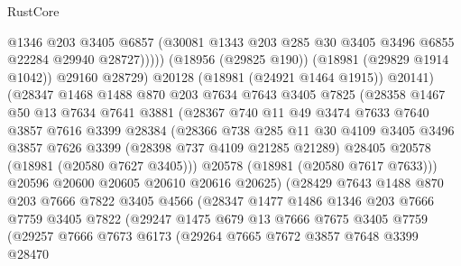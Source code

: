\begin{lexlean}{RustCore}
\begin{coremodule}
                        @1346
                        @203
                        @3405
                        @6857
                        (@30081 @1343 @203 @285 @30 @3405 @3496 @6855 @22284 @29940 @28727)))))
                (@18956 (@29825 @190))
                (@18981 (@29829 @1914 @1042))
                @29160
                @28729)
              @20128
              (@18981 (@24921 @1464 @1915))
              @20141)
            (@28347
              @1468
              @1488
              @870
              @203
              @7634
              @7643
              @3405
              @7825
              (@28358
                @1467
                @50
                @13
                @7634
                @7641
                @3881
                (@28367
                  @740
                  @11
                  @49
                  @3474
                  @7633
                  @7640
                  @3857
                  @7616
                  @3399
                  @28384
                  (@28366
                    @738
                    @285
                    @11
                    @30
                    @4109
                    @3405
                    @3496
                    @3857
                    @7626
                    @3399
                    (@28398 @737 @4109 @21285 @21289)
                    @28405
                    @20578
                    (@18981 (@20580 @7627 @3405)))
                  @20578
                  (@18981 (@20580 @7617 @7633)))
                @20596
                @20600
                @20605
                @20610
                @20616
                @20625)
              (@28429
                @7643
                @1488
                @870
                @203
                @7666
                @7822
                @3405
                @4566
                (@28347
                  @1477
                  @1486
                  @1346
                  @203
                  @7666
                  @7759
                  @3405
                  @7822
                  (@29247
                    @1475
                    @679
                    @13
                    @7666
                    @7675
                    @3405
                    @7759
                    (@29257
                      @7666
                      @7673
                      @6173
                      (@29264
                        @7665
                        @7672
                        @3857
                        @7648
                        @3399
                        @28470

\end{coremodule}
\end{lexlean}
